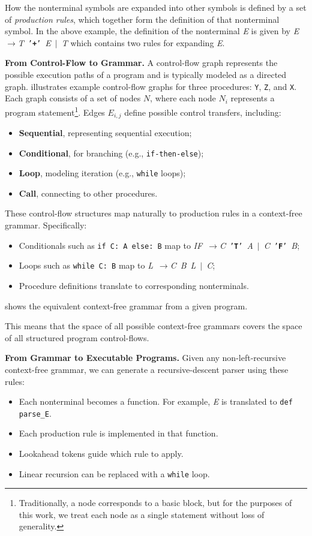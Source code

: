\documentclass[conference,anonymous,review]{IEEEtran}
\def\<#1>{\texttt{#1}}
\def\term#1{\texttt{'\textbf{#1}'}}
\def\nonterm#1{\textlangle\textnormal{\emph{#1}}\textrangle}
\def\expandsto{\(\rightarrow{}\)}
\begin{document}
How the nonterminal symbols are expanded into other symbols is defined
by a set of \emph{production rules}, which together form the definition of that
nonterminal symbol. In the above example, the definition of the nonterminal \nonterm{E} is given
by
\mbox{\nonterm{E} \expandsto \nonterm{T} \term{+} \nonterm{E} $\mid$ \nonterm{T}} which
contains two rules for expanding \nonterm{E}.

\noindent\textbf{From Control-Flow to Grammar.}
A control-flow graph represents the possible execution paths of a program and is
typically modeled as a directed graph.
 illustrates example control-flow graphs for three procedures:
\<Y>, \<Z>, and \<X>.
Each graph consists of a set of nodes $N$, where each node $N_i$ represents a
program statement\footnote{Traditionally, a node corresponds to a basic block,
but for the purposes of this work, we treat each node as a single statement without loss of generality.}.
Edges $E_{i,j}$ define possible control transfers, including:
\begin{itemize}
    \item \textbf{Sequential}, representing sequential execution;
    \item \textbf{Conditional}, for branching (e.g., \<if-then-else>);
    \item \textbf{Loop}, modeling iteration (e.g., \<while> loops);
    \item \textbf{Call}, connecting to other procedures.
\end{itemize}

These control-flow structures map naturally to production rules in a
context-free grammar. Specifically:
\begin{itemize}
    \item Conditionals such as \<if C: A else: B> map to
      \mbox{\nonterm{IF} \expandsto \nonterm{C} \term{T} \nonterm{A}  $|$ \nonterm{C} \term{F} \nonterm{B}};
    \item Loops such as \<while C: B> map to
      \mbox{\nonterm{L} \expandsto \nonterm{C} \nonterm{B} \nonterm{L} $|$ \nonterm{C}};
    \item Procedure definitions translate to corresponding nonterminals.
\end{itemize}
 shows the equivalent context-free grammar from a given
program.

This means that the space of all possible context-free grammars covers the space
of all structured program control-flows.

\noindent\textbf{From Grammar to Executable Programs.}
Given any non-left-recursive context-free
grammar, we can generate a recursive-descent parser using these rules:
\begin{itemize}
  \item Each nonterminal becomes a function. For example, \nonterm{E} is translated to \<def parse\_E>.
  \item Each production rule is implemented in that function.
  \item Lookahead tokens guide which rule to apply.
  \item Linear recursion can be replaced with a \<while> loop.
\end{itemize}
\end{document}
